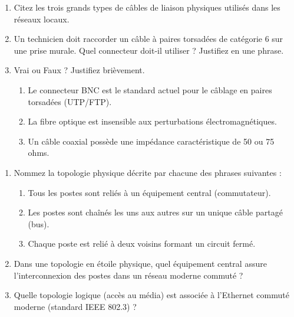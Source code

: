 \documentclass[11pt]{article}
\begin{document}
\begin{exercice}
\begin{enumerate}
    \item Citez les trois grands types de câbles de liaison physiques utilisés dans les réseaux locaux.
    \item Un technicien doit raccorder un câble à paires torsadées de catégorie 6 sur une prise murale. Quel connecteur doit-il utiliser ? Justifiez en une phrase.
    \item Vrai ou Faux ? Justifiez brièvement.
    \begin{enumerate}
        \item Le connecteur BNC est le standard actuel pour le câblage en paires torsadées (UTP/FTP).
        \item La fibre optique est insensible aux perturbations électromagnétiques.
        \item Un câble coaxial possède une impédance caractéristique de 50 ou 75 ohms.
    \end{enumerate}
\end{enumerate}
\end{exercice}

\begin{exercice}
\begin{enumerate}
    \item Nommez la topologie physique décrite par chacune des phrases suivantes :
    \begin{enumerate}
        \item Tous les postes sont reliés à un équipement central (commutateur).
        \item Les postes sont chaînés les uns aux autres sur un unique câble partagé (bus).
        \item Chaque poste est relié à deux voisins formant un circuit fermé.
    \end{enumerate}
    \item Dans une topologie en étoile physique, quel équipement central assure l'interconnexion des postes dans un réseau moderne commuté ?
    \item Quelle topologie logique (accès au média) est associée à l'Ethernet commuté moderne (standard IEEE 802.3) ?
\end{enumerate}
\end{exercice}
\end{document}
